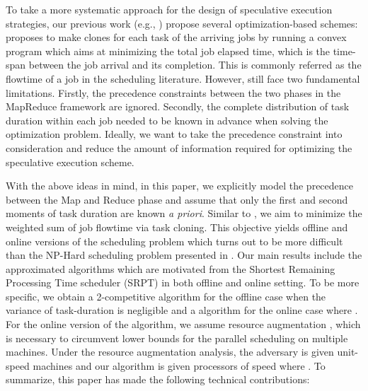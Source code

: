 \documentclass[10pt,conference,compsocconf,letterpaper]{IEEEtran}
\begin{document}
To take a more systematic
approach for the design of speculative execution strategies,
our previous work (e.g., \cite{speculative-single,speculative-single-optimization,speculative-multiple-optimization}) propose several optimization-based schemes:
 \cite{speculative-multiple-optimization} proposes to make clones for each task of the arriving jobs by running a convex program which aims at minimizing
the total job elapsed time, which is the time-span between the job arrival and its completion. This is commonly referred as the flowtime of a job in the scheduling literature. However, \cite{speculative-single,speculative-single-optimization,speculative-multiple-optimization} still
 face two fundamental limitations.   Firstly, the precedence constraints between the two phases in the MapReduce framework are ignored.
 Secondly, the complete distribution of task duration within each job needed to be known in advance when solving the optimization problem. 
 Ideally, we want to take the precedence
 constraint into consideration and reduce the amount of information required for optimizing the speculative execution scheme. 


With the above ideas in mind, in this paper, we explicitly model the precedence between the Map and Reduce phase and assume that only the first and second moments of task duration are known \textit{a priori}. Similar to \cite{speculative-multiple-optimization}, we aim to minimize the weighted sum of  job flowtime via task cloning. This objective yields 
offline and online versions of the scheduling problem which turns out to be more difficult than the NP-Hard scheduling problem presented in \cite{Schedulers}. Our main results include the approximated algorithms which are motivated from the Shortest Remaining Processing Time scheduler (SRPT) in both offline and online setting. To be more specific, we obtain a 2-competitive algorithm for the offline case
when the variance of task-duration is negligible and a   algorithm for the online case where . For the online version of the algorithm, we assume resource augmentation \cite{speed}, which is necessary to circumvent lower bounds for the parallel scheduling on multiple machines. Under the resource augmentation analysis, the adversary is given  unit-speed machines and our algorithm is given  processors of speed  where .
To summarize, this paper has made the following technical contributions:
\end{document}
